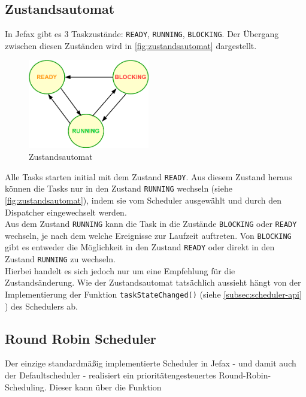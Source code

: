 \documentclass[fontsize=12pt, toc=bibliography, notitlepage]{scrreprt}
\newcommand{\refnn}[1]{\ref{#1} \nameref{#1}}
\begin{document}
\newpage

\subsection{Zustandsautomat}
\label{subsec:zustandsautomat}
In Jefax gibt es 3 Taskzustände: \lstinline$READY$, \lstinline$RUNNING$, \lstinline$BLOCKING$. Der Übergang zwischen diesen Zuständen wird in \autoref{fig:zustandsautomat} dargestellt.

\begin{figure}[H]
	\centering
	\includegraphics[width=200px]{images/Zustandsautomat.png}
	\caption{Zustandsautomat}
	\label{fig:zustandsautomat}
\end{figure}

Alle Tasks starten initial mit dem Zustand \lstinline$READY$. Aus diesem Zustand heraus können die Tasks nur in den Zustand \lstinline$RUNNING$ wechseln (siehe \autoref{fig:zustandsautomat}), indem sie vom Scheduler ausgewählt und durch den Dispatcher eingewechselt werden.\\
Aus dem Zustand \lstinline$RUNNING$ kann die Task in die Zustände \lstinline$BLOCKING$ oder \lstinline$READY$ wechseln, je nach dem welche Ereignisse zur Laufzeit auftreten. Von \lstinline$BLOCKING$ gibt es entweder die Möglichkeit in den Zustand \lstinline$READY$ oder direkt in den Zustand \lstinline$RUNNING$ zu wechseln.\\
Hierbei handelt es sich jedoch nur um eine Empfehlung für die Zustandsänderung. Wie der Zustandsautomat tatsächlich aussieht hängt von der Implementierung der Funktion \lstinline$taskStateChanged()$ (siehe \refnn{subsec:scheduler-api}) des Schedulers ab.

\newpage

\subsection{Round Robin Scheduler}
\label{subsec:round-robin-scheduler}
Der einzige standardmäßig implementierte Scheduler in Jefax - und damit auch der Defaultscheduler - realisiert ein prioritätengesteuertes Round-Robin-Scheduling. Dieser kann über die Funktion
\end{document}
